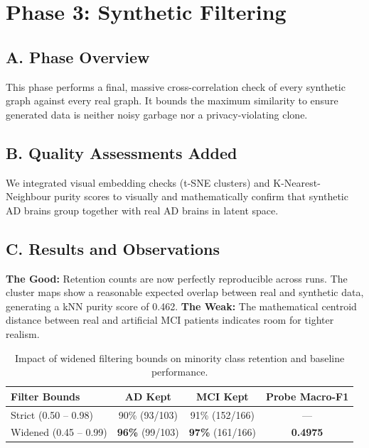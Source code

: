 \documentclass[11pt, a4paper]{article}
\begin{document}
\section{Phase 3: Synthetic Filtering}

\subsection{A. Phase Overview}
This phase performs a final, massive cross-correlation check of every synthetic graph against every real graph. It bounds the maximum similarity to ensure generated data is neither noisy garbage nor a privacy-violating clone.

\subsection{B. Quality Assessments Added}
We integrated visual embedding checks (t-SNE clusters) and K-Nearest-Neighbour purity scores to visually and mathematically confirm that synthetic AD brains group together with real AD brains in latent space.

\subsection{C. Results and Observations}
\textbf{The Good:} Retention counts are now perfectly reproducible across runs. The cluster maps show a reasonable expected overlap between real and synthetic data, generating a kNN purity score of 0.462.
\textbf{The Weak:} The mathematical centroid distance between real and artificial MCI patients indicates room for tighter realism.

\begin{table}[H]
\centering
\begin{tabular}{@{}lccc@{}}
\toprule
\textbf{Filter Bounds} & \textbf{AD Kept} & \textbf{MCI Kept} & \textbf{Probe Macro-F1} \\
\midrule
Strict (0.50 -- 0.98) & 90\% (93/103) & 91\% (152/166) & --- \\
Widened (0.45 -- 0.99) & \textbf{96\%} (99/103) & \textbf{97\%} (161/166) & \textbf{0.4975} \\
\bottomrule
\end{tabular}
\caption{Impact of widened filtering bounds on minority class retention and baseline performance.}
\end{table}
\end{document}
